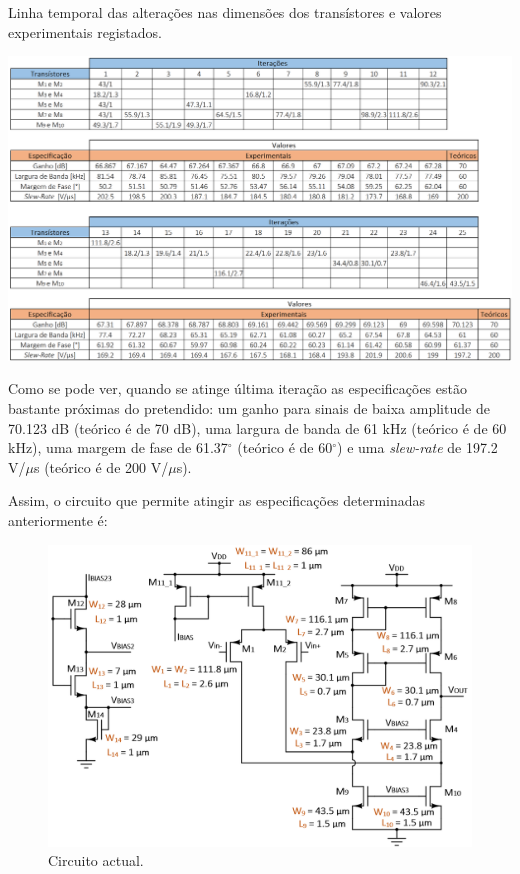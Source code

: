 \documentclass[11pt]{article}
\numberwithin{equation}{section}
\begin{document}
\begin{table}[H]
	\centering
	\caption{Linha temporal das alterações nas dimensões dos transístores e valores experimentais registados.}
	\vspace{-1.5mm}
	\includegraphics[keepaspectratio=true, scale=0.40]{teoricas/tabelaF1}
\end{table}

Como se pode ver, quando se atinge última iteração as especificações estão bastante próximas do pretendido: um ganho para sinais de baixa amplitude de 70.123 dB (teórico é de 70 dB), uma largura de banda de 61 kHz (teórico é de 60 kHz), uma margem de fase de 61.37$^\circ$ (teórico é de 60$^\circ$) e uma \textit{slew-rate} de 197.2 V/$\mu$s (teórico é de 200 V/$\mu$s).

Assim, o circuito que permite atingir as especificações determinadas anteriormente é:

\begin{figure}[H]
	\centering
	\includegraphics[keepaspectratio=true, scale=0.70]{teoricas/ajustesF1}
	\vspace{-0.5em}
	\caption{Circuito actual.}
	\vspace{-0.8em}
\end{figure}
\end{document}
